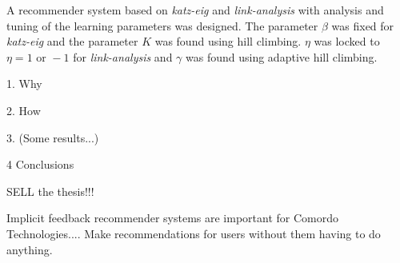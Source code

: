 

A recommender system based on \textit{katz-eig} and \textit{link-analysis} with analysis and tuning of the learning parameters was designed. The parameter $\beta$ was fixed for \textit{katz-eig} and the parameter $K$ was found using hill climbing. $\eta$ was locked to $\eta = 1 \text{ or } -1$ for \textit{link-analysis} and $\gamma$ was found using adaptive hill climbing.

1. Why

2. How

3. (Some results...)

4 Conclusions

SELL the thesis!!!

Implicit feedback recommender systems are important for Comordo Technologies.... Make recommendations for users without them having to do anything.
